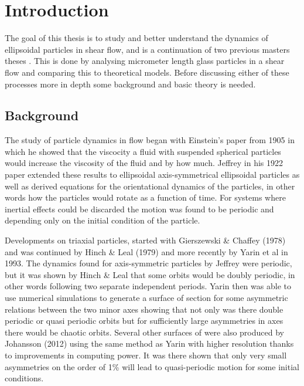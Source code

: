 \section{Introduction}
The goal of this thesis is to study and better understand the dynamics of ellipsoidal particles in shear flow, and is a continuation of two previous masters theses \cite{AntonThesis, JonasThesis}. This is done by analysing micrometer length glass particles in a shear flow and comparing this to theoretical models. Before discussing either of these processes more in depth some background and basic theory is needed.

\subsection{Background}
The study of particle dynamics in flow began with Einstein's paper from 1905 \cite{Einstein} in which he showed that the viscocity a fluid with suspended spherical particles would increase the viscosity of the fluid and by how much. Jeffrey in his 1922 paper \cite{Jeffrey} extended these results to ellipsoidal axis-symmetrical ellipsoidal  particles as well as derived equations for the orientational dynamics of the particles, in other words how the particles would rotate as a function of time. For systems where inertial effects could be discarded the motion was found to be periodic and depending only on the initial condition of the particle. 

Developments on triaxial particles, started with Gierszewski \& Chaffey (1978)\cite{Chaffey} and was continued by Hinch \& Leal (1979)\cite{Leal} and more recently by Yarin et al in 1993\cite{Yarin}. 
The dynamics found for axis-symmetric particles by Jeffrey were periodic, but it was shown by Hinch \& Leal that some orbits would be doubly periodic, in other words following two separate independent periods. 
Yarin then was able to use numerical simulations to generate a surface of section \cite{SurfaceOfSection} for some asymmetric relations between the two minor axes showing that not only was there double periodic or quasi periodic orbits but for sufficiently large asymmetries in axes there would be chaotic orbits. 
Several other surfaces of were also produced by Johansson (2012)\cite{AntonThesis} using the same method as Yarin with higher resolution thanks to improvements in computing power. It was there shown that only very small asymmetries on the order of 1\% will lead to quasi-periodic motion for some initial conditions.

